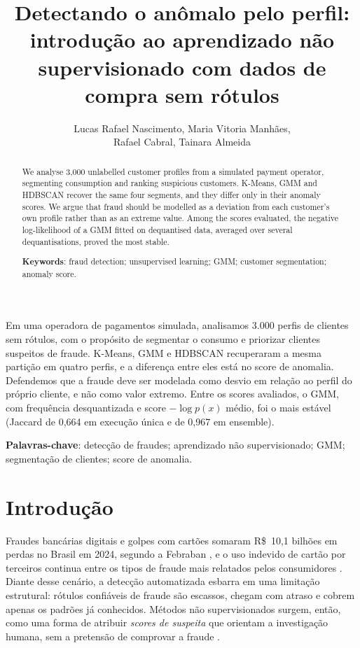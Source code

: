 \documentclass[12pt]{article}
\title{Detectando o anômalo pelo perfil: introdução ao aprendizado não supervisionado com dados de compra sem rótulos}
\author{Lucas Rafael Nascimento\inst{1}, Maria Vitoria Manhães\inst{1},\\
  Rafael Cabral\inst{1}, Tainara Almeida\inst{1}}
\begin{document}
\maketitle

\begin{resumo}
Em uma operadora de pagamentos simulada, analisamos 3.000 perfis de clientes sem rótulos, com o propósito de segmentar o consumo e priorizar clientes suspeitos de fraude. K-Means, GMM e HDBSCAN recuperaram a mesma partição em quatro perfis, e a diferença entre eles está no score de anomalia. Defendemos que a fraude deve ser modelada como desvio em relação ao perfil do próprio cliente, e não como valor extremo. Entre os scores avaliados, o GMM, com frequência desquantizada e score $-\log p(x)$ médio, foi o mais estável (Jaccard de 0,664 em execução única e de 0,967 em ensemble).

\textbf{Palavras-chave}: detecção de fraudes; aprendizado não supervisionado; GMM; segmentação de clientes; score de anomalia.
\end{resumo}

\begin{abstract}
We analyse 3,000 unlabelled customer profiles from a simulated payment operator, segmenting consumption and ranking suspicious customers. K-Means, GMM and HDBSCAN recover the same four segments, and they differ only in their anomaly scores. We argue that fraud should be modelled as a deviation from each customer's own profile rather than as an extreme value. Among the scores evaluated, the negative log-likelihood of a GMM fitted on dequantised data, averaged over several dequantisations, proved the most stable.

\textbf{Keywords}: fraud detection; unsupervised learning; GMM; customer segmentation; anomaly score.
\end{abstract}

\section{Introdução}
Fraudes bancárias digitais e golpes com cartões somaram R\$~10,1 bilhões em perdas no Brasil em
2024, segundo a Febraban \cite{febraban2025}, e o uso indevido de cartão por terceiros continua
entre os tipos de fraude mais relatados pelos consumidores \cite{serasa2025}. Diante desse cenário,
a detecção automatizada esbarra em uma limitação estrutural: rótulos confiáveis de fraude são
escassos, chegam com atraso e cobrem apenas os padrões já conhecidos. Métodos não supervisionados
surgem, então, como uma forma de atribuir \emph{scores de suspeita} que orientam a investigação
humana, sem a pretensão de comprovar a fraude \cite{bolton2002fraud}.
\end{document}
